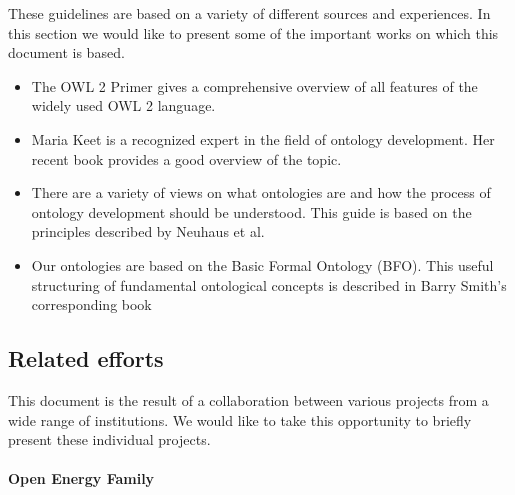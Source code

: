 These guidelines are based on a variety of different sources and experiences. In this section we would like to present some of the important works on which this document is based.


\begin{itemize}
    \item The OWL 2 Primer gives a comprehensive overview of all features of the widely used OWL 2 language. \cite{owlprimer}
    \item Maria Keet is a recognized expert in the field of ontology development. Her recent book provides a good overview of the topic. \cite{keet2018introduction}
    \item There are a variety of views on what ontologies are and how the process of ontology development should be understood. This guide is based on the principles described by Neuhaus et al. \cite{Neuhaus2022OntologyDI, neuhaus2018ontology}
    \item Our ontologies are based on the Basic Formal Ontology (BFO). This useful structuring of fundamental ontological concepts is described in Barry Smith's corresponding book \cite{bfo-book}
\end{itemize}

\subsection{Related efforts}

This document is the result of a collaboration between various projects from a wide range of institutions. We would like to take this opportunity to briefly present these individual projects.

\paragraph{Open Energy Family}

